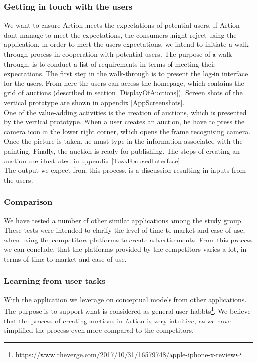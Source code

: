 \subsubsection{Getting in touch with the users}

We want to ensure Artion meets the expectations of potential users. If Artion dont manage to meet the expectations, the consumers might reject using the application. In order to meet the users expectations, we intend to initiate a walk-through process in cooperation with potential users. The purpose of a walk-through, is to conduct a list of requirements in terms of meeting their expectations. The first step in the walk-through is to present the log-in interface for the users. From here the users can access the homepage, which contains the grid of auctions (described in section \ref{DisplayOfAuctions}). Screen shots of the vertical prototype are shown in appendix \ref{AppScreenshots}.\\
\forceindent One of the value-adding activities is the creation of auctions, which is presented by the vertical prototype. When a user creates an auction, he have to press the camera icon in the lower right corner, which opens the frame recognising camera. Once the picture is taken, he must type in the information associated with the painting. Finally, the auction is ready for publishing. The steps of creating an auction are illustrated in appendix \ref{TaskFocusedInterface}\\
\forceindent The output we expect from this process, is a discussion resulting in inputs from the users. 

\subsubsection{Comparison}

We have tested a number of other similar applications among the study group. These tests were intended to clarify the level of time to market and ease of use, when using the competitors platforms to create advertisements. From this process we can conclude, that the platforms provided by the competitors varies a lot, in terms of time to market and ease of use. 

\subsubsection{Learning from user tasks}

With the application we leverage on conceptual models from other applications. The purpose is to support what is considered as general user habbts\footnote{\url{https://www.theverge.com/2017/10/31/16579748/apple-iphone-x-review}}. We believe that the process of creating auctions in Artion is very intuitive, as we have simplified the process even more compared to the competitors.